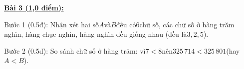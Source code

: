 \documentclass[11pt,a4paper]{article}
\begin{document}
\noindent\textbf{\underline{Bài 3 (1,0 điểm):}}\par\vspace{3pt}
Bước 1 (0.5đ): Nhận xét hai số$A$và$B$đều có$6$chữ số, các chữ số ở hàng trăm nghìn, hàng chục nghìn, hàng nghìn đều giống nhau (đều là$3, 2, 5$).\par\noindent Bước 2 (0.5đ): So sánh chữ số ở hàng trăm: vì$7 < 8$nên$325\,714 < 325\,801$(hay$A < B$).\par\vspace{8pt}
\end{document}
